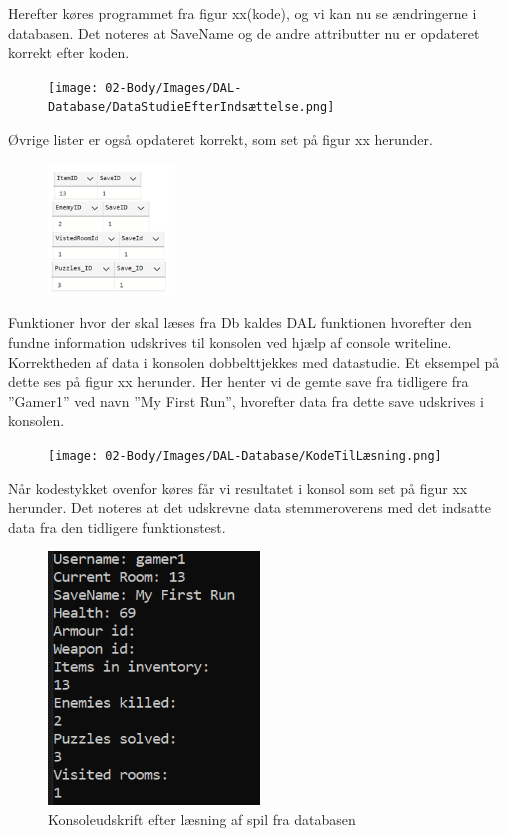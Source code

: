Herefter køres programmet fra figur xx(kode), og vi kan nu se ændringerne i databasen.
Det noteres at SaveName og de andre attributter nu er opdateret korrekt efter koden.

\begin{figure}[H]
\centering
\texttt{[image: 02-Body/Images/DAL-Database/DataStudieEfterIndsættelse.png]}
\caption{}
\label{fig:}
\end{figure}

Øvrige lister er også opdateret korrekt, som set på figur xx herunder.

\begin{figure}[H]
\centering
\includegraphics[width = 0.3\textwidth]{02-Body/Images/DAL-Database/Lister.png}
\caption{}
\label{fig:}
\end{figure}

Funktioner hvor der skal læses fra Db kaldes DAL funktionen hvorefter den fundne information udskrives til konsolen ved hjælp af console writeline. Korrektheden af data i konsolen dobbelttjekkes med datastudie.
Et eksempel på dette ses på figur xx herunder.
Her henter vi de gemte save fra tidligere fra ”Gamer1” ved navn ”My First Run”, hvorefter data fra dette save udskrives i konsolen.


\begin{figure}[H]
\centering
\texttt{[image: 02-Body/Images/DAL-Database/KodeTilLæsning.png]}
\caption{}
\label{fig:KodeTilLæsningAfSave}
\end{figure}

Når kodestykket ovenfor køres får vi resultatet i konsol som set på figur xx herunder.
Det noteres at det udskrevne data stemmeroverens med det indsatte data fra den tidligere funktionstest.

\begin{figure}[H]
\centering
\includegraphics[width = 0.5\textwidth]{02-Body/Images/DAL-Database/ConsoleOutput.png}
\caption{Konsoleudskrift efter læsning af spil fra databasen}
\label{fig:Modulttest-consoleOutput}
\end{figure}


